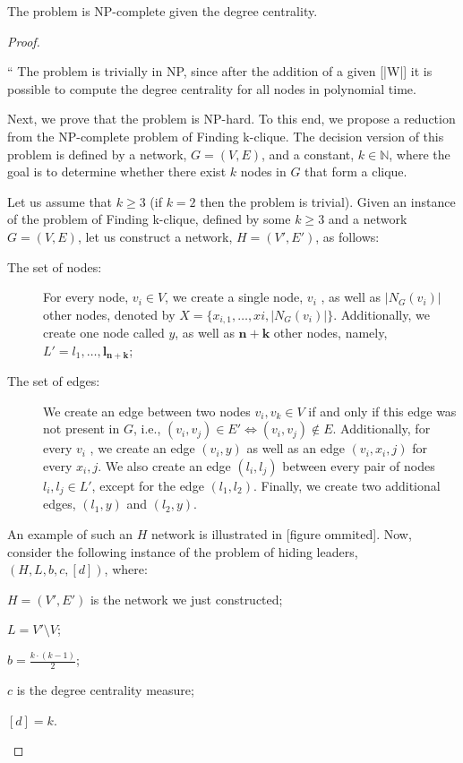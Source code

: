 \begin{theorem}
    The \HL problem is NP-complete given the degree centrality.
\end{theorem}
\begin{proof}
    \itshape{``
     The problem is trivially in NP, since after the addition of a given [|W|] it is possible to
    compute the degree centrality for all nodes in polynomial time.
    
    Next, we prove that the problem is NP-hard. To this end, we propose a reduction from the NP-complete problem of Finding k-clique.
    The decision version of this problem is defined by a network,
    $G = (V , E)$, and a constant, $k \in \mathbb{N}$, where the goal is to determine whether there exist $k$ nodes in $G$ that form a clique.
    
    Let us assume that $k \geq 3$ (if $k = 2$ then the problem is trivial). Given an instance of the problem
    of Finding k-clique, defined by some $k \geq 3$ and a network $G = (V , E)$, let us construct a network,
    $H = (V', E')$, as follows:
    
    \begin{description}
        \item[The set of nodes:] For every node, $v_i \in V$, we create a single node, $v_i$ , as well as $|N_G(v_i)|$
        other nodes, denoted by $X = \{x_{i,1},\dots, x{i,|N_G(v_i)|} \}$. Additionally, we create one node called $y$,
        as well as $\boldsymbol{n + k}$ other nodes, namely, $L' = l_1,\dots, \boldsymbol{l_{n+k}}$;
        \item[The set of edges:] We create an edge between two nodes $v_i, v_k \in V$ if and only if this edge
        was not present in $G$, i.e., $(v_i, v_j ) \in E' \Leftrightarrow (v_i, v_j ) \notin E$.
        Additionally, for every $v_i$ , we create an edge $(v_i , y)$ as well as an edge $(v_i, x_i, j)$ for every $x_i, j$.
        We also create an edge $(l_i, l_j)$ between every pair of nodes $l_i, l_j \in L'$, except for the edge $(l_1, l_2)$.
        Finally, we create two additional edges, $(l_1, y)$ and $(l_2, y)$.
    \end{description}

    An example of such an $H$ network is illustrated in [figure ommited]. Now, consider the following instance
    of the problem of hiding leaders, $(H, L, b, c, [d] )$, where:

    \begin{description}
        \item $H = (V', E')$ is the network we just constructed;
        \item $L = V' \setminus V$;
        \item $b = \frac{k\cdot(k-1)}{2}$;
        \item $c$ is the degree centrality measure;
        \item $[d] = k$. 
    \end{description}

}
\end{proof}
